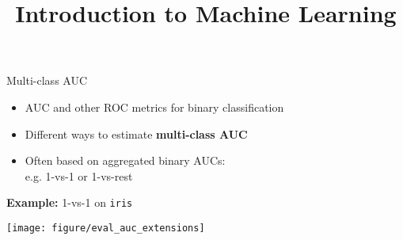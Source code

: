 \documentclass[11pt,compress,t,notes=noshow, xcolor=table]{beamer}
\title{Introduction to Machine Learning}
\begin{document}


\begin{vbframe}{Multi-class AUC}


\begin{itemize}
  \item AUC and other ROC metrics for binary classification
  \item Different ways to estimate \textbf{multi-class AUC}
  \item Often based on aggregated binary AUCs:\\ %
  e.g. 1-vs-1 or 1-vs-rest
\end{itemize}

\vfill



\textbf{Example:} 1-vs-1 on \texttt{iris}

\centering
\texttt{[image: figure/eval\_auc\_extensions]}




\end{vbframe}
\end{document}
